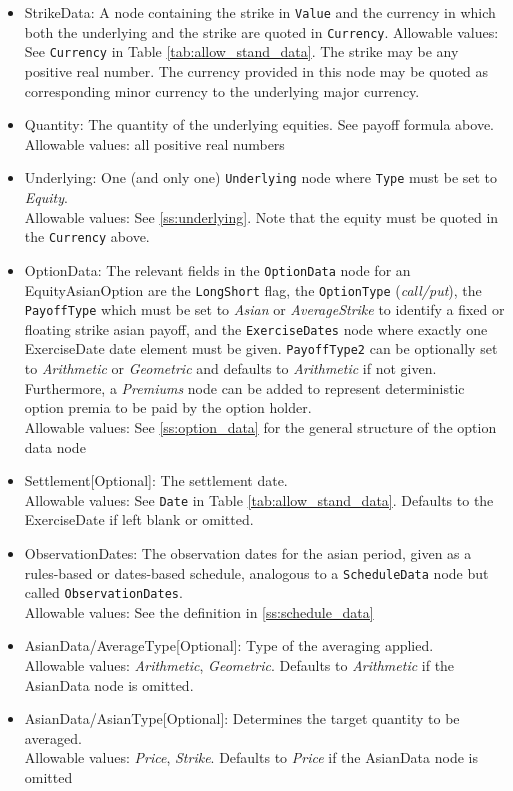 \begin{itemize}
	\item StrikeData: A node containing the strike in \lstinline!Value! and the currency in which both the underlying and the strike are quoted in \lstinline!Currency!. Allowable values: See \lstinline!Currency! in Table \ref{tab:allow_stand_data}. The strike may be any positive real number. The currency provided in this node may be quoted as corresponding minor currency to the underlying major currency.
	\item Quantity: The quantity of the underlying equities. See payoff formula above. \\
	Allowable values: all positive real numbers
	\item Underlying: One (and only one) \lstinline!Underlying! node where \lstinline!Type! must be set to \emph{Equity}. \\
	Allowable values: See \ref{ss:underlying}. Note that the equity must be quoted in the \lstinline!Currency! above.
	\item OptionData: The relevant fields in the \lstinline!OptionData! node for an EquityAsianOption are the \lstinline!LongShort! flag, the \lstinline!OptionType! (\emph{call/put}), the \lstinline!PayoffType! which must be set to \emph{Asian} or \emph{AverageStrike} to
	identify a fixed or floating strike asian payoff, and the \lstinline!ExerciseDates! node where exactly one ExerciseDate date element must be given. \lstinline!PayoffType2! can be optionally set to \emph{Arithmetic} or \emph{Geometric} and defaults to \emph{Arithmetic} if not given. Furthermore, a \emph{Premiums} node can be added to represent deterministic option premia to be paid by the option holder.\\
	Allowable values: See \ref{ss:option_data} for the general structure of the option data node
	\item Settlement[Optional]: The settlement date.  \\
	Allowable values: See \lstinline!Date! in Table \ref{tab:allow_stand_data}. Defaults to the ExerciseDate if left blank or omitted.
	\item ObservationDates: The observation dates for the asian period, given as a rules-based or dates-based schedule, analogous to a \lstinline!ScheduleData! node but called \lstinline!ObservationDates!.  \\
	Allowable values: See the definition in \ref{ss:schedule_data}
	\item AsianData/AverageType[Optional]: Type of the averaging applied. \\
        Allowable values: \emph{Arithmetic}, \emph{Geometric}. Defaults to \emph{Arithmetic} if the AsianData node is omitted.
	\item AsianData/AsianType[Optional]: Determines the target quantity to be averaged. \\
        Allowable values: \emph{Price}, \emph{Strike}. Defaults to \emph{Price} if the AsianData node is omitted
\end{itemize}
